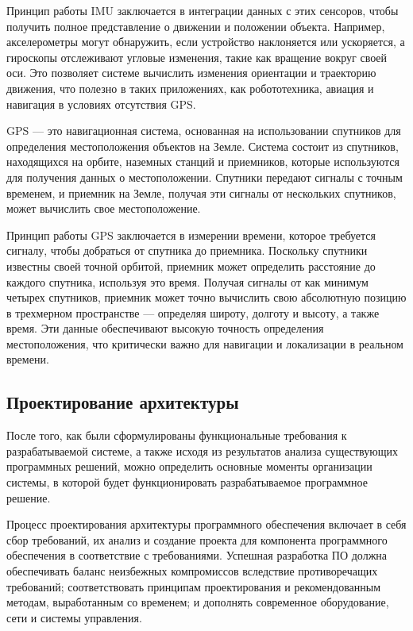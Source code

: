 Принцип работы IMU заключается в интеграции данных с этих сенсоров, чтобы
получить полное представление о движении и положении объекта. Например,
акселерометры могут обнаружить, если устройство наклоняется или ускоряется, а
гироскопы отслеживают угловые изменения, такие как вращение вокруг своей оси.
Это позволяет системе вычислить изменения ориентации и траекторию движения, что
полезно в таких приложениях, как робототехника, авиация и навигация в условиях
отсутствия GPS.

GPS — это навигационная система, основанная на использовании спутников для
определения местоположения объектов на Земле. Система состоит из спутников,
находящихся на орбите, наземных станций и приемников, которые используются для
получения данных о местоположении. Спутники передают сигналы с точным временем,
и приемник на Земле, получая эти сигналы от нескольких спутников, может
вычислить свое местоположение.

Принцип работы GPS заключается в измерении времени, которое требуется сигналу,
чтобы добраться от спутника до приемника. Поскольку спутники известны своей
точной орбитой, приемник может определить расстояние до каждого спутника,
используя это время. Получая сигналы от как минимум четырех спутников, приемник
может точно вычислить свою абсолютную позицию в трехмерном пространстве —
определяя широту, долготу и высоту, а также время. Эти данные обеспечивают
высокую точность определения местоположения, что критически важно для навигации
и локализации в реальном времени.

\subsection{Проектирование архитектуры}	

После того, как были сформулированы функциональные требования к разрабатываемой
системе,  а  также  исходя  из  результатов  анализа  существующих
программных решений, можно определить основные моменты организации системы,  в
которой  будет  функционировать  разрабатываемое  программное  решение.

Процесс проектирования архитектуры программного обеспечения включает в себя сбор
требований, их анализ и создание проекта для компонента программного
обеспечения в соответствие с требованиями. Успешная разработка ПО должна
обеспечивать баланс неизбежных компромиссов вследствие противоречащих
требований;  соответствовать  принципам  проектирования  и  рекомендованным
методам,  выработанным  со  временем;  и  дополнять  современное оборудование,
сети и системы управления. 

